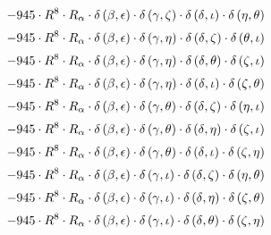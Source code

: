 \begin{subequations}
\begin{gather}
 \\[0.2em] \notag 		 - 945 \cdot R^{8} \cdot R_{\alpha{}} \cdot \delta{}\left(\beta{}, \epsilon{}\right) \cdot \delta{}\left(\gamma{}, \zeta{}\right) \cdot \delta{}\left(\delta{}, \iota{}\right) \cdot \delta{}\left(\eta{}, \theta{}\right) 
 \\[0.2em] \notag 		 - 945 \cdot R^{8} \cdot R_{\alpha{}} \cdot \delta{}\left(\beta{}, \epsilon{}\right) \cdot \delta{}\left(\gamma{}, \eta{}\right) \cdot \delta{}\left(\delta{}, \zeta{}\right) \cdot \delta{}\left(\theta{}, \iota{}\right) 
 \\[0.2em] \notag 		 - 945 \cdot R^{8} \cdot R_{\alpha{}} \cdot \delta{}\left(\beta{}, \epsilon{}\right) \cdot \delta{}\left(\gamma{}, \eta{}\right) \cdot \delta{}\left(\delta{}, \theta{}\right) \cdot \delta{}\left(\zeta{}, \iota{}\right) 
 \\[0.2em] \notag 		 - 945 \cdot R^{8} \cdot R_{\alpha{}} \cdot \delta{}\left(\beta{}, \epsilon{}\right) \cdot \delta{}\left(\gamma{}, \eta{}\right) \cdot \delta{}\left(\delta{}, \iota{}\right) \cdot \delta{}\left(\zeta{}, \theta{}\right) 
 \\[0.2em] \notag 		 - 945 \cdot R^{8} \cdot R_{\alpha{}} \cdot \delta{}\left(\beta{}, \epsilon{}\right) \cdot \delta{}\left(\gamma{}, \theta{}\right) \cdot \delta{}\left(\delta{}, \zeta{}\right) \cdot \delta{}\left(\eta{}, \iota{}\right) 
 \\[0.2em] \notag 		 - 945 \cdot R^{8} \cdot R_{\alpha{}} \cdot \delta{}\left(\beta{}, \epsilon{}\right) \cdot \delta{}\left(\gamma{}, \theta{}\right) \cdot \delta{}\left(\delta{}, \eta{}\right) \cdot \delta{}\left(\zeta{}, \iota{}\right) 
 \\[0.2em] \notag 		 - 945 \cdot R^{8} \cdot R_{\alpha{}} \cdot \delta{}\left(\beta{}, \epsilon{}\right) \cdot \delta{}\left(\gamma{}, \theta{}\right) \cdot \delta{}\left(\delta{}, \iota{}\right) \cdot \delta{}\left(\zeta{}, \eta{}\right) 
 \\[0.2em] \notag 		 - 945 \cdot R^{8} \cdot R_{\alpha{}} \cdot \delta{}\left(\beta{}, \epsilon{}\right) \cdot \delta{}\left(\gamma{}, \iota{}\right) \cdot \delta{}\left(\delta{}, \zeta{}\right) \cdot \delta{}\left(\eta{}, \theta{}\right) 
 \\[0.2em] \notag 		 - 945 \cdot R^{8} \cdot R_{\alpha{}} \cdot \delta{}\left(\beta{}, \epsilon{}\right) \cdot \delta{}\left(\gamma{}, \iota{}\right) \cdot \delta{}\left(\delta{}, \eta{}\right) \cdot \delta{}\left(\zeta{}, \theta{}\right) 
 \\[0.2em] \notag 		 - 945 \cdot R^{8} \cdot R_{\alpha{}} \cdot \delta{}\left(\beta{}, \epsilon{}\right) \cdot \delta{}\left(\gamma{}, \iota{}\right) \cdot \delta{}\left(\delta{}, \theta{}\right) \cdot \delta{}\left(\zeta{}, \eta{}\right) 

\end{gather}
\end{subequations}
